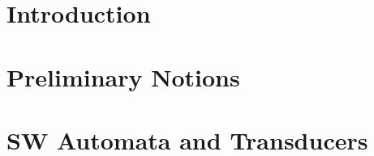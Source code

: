 \date{\today}


\thispagestyle{empty}
\maketitle

\begin{abstract}

\end{abstract}




\section{Introduction} \label{sec:intro}




\section{Preliminary Notions}
\label{section:prelim}\label{sec:prelim}


\label{section:semiring}\label{sec:semiring}


\label{section:symbols}





\section{SW Automata and Transducers}
\label{section:transducer}\label{sec:transducer}
\label{section:SWA}\label{sec:SWA}
\label{section:SWT}\label{sec:SWT}

